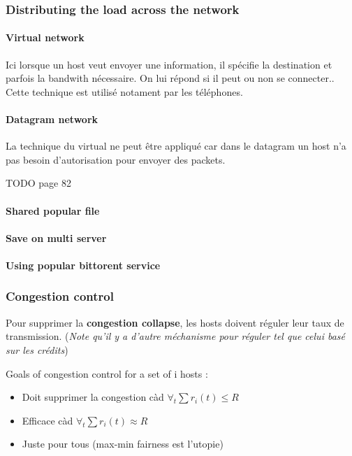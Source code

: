 \subsubsection{Distributing the load across the network}

\paragraph{Virtual network}
Ici lorsque un host veut envoyer une information, il spécifie la destination et parfois la
bandwith nécessaire. On lui répond si il peut ou non se connecter.. Cette technique
est utilisé notament par les téléphones.

\paragraph{Datagram network}
La technique du virtual ne peut être appliqué car dans le datagram un host n'a pas
besoin d'autorisation pour envoyer des packets.

TODO page 82


\paragraph{Shared popular file}

\paragraph{Save on multi server}

\paragraph{Using popular bittorent service}


\subsubsection{Congestion control}

Pour supprimer la \textbf{congestion collapse}, les hosts doivent réguler leur taux
de transmission. (\textit{Note qu'il y a d'autre méchanisme pour réguler tel que celui
basé sur les crédits})

Goals of congestion control for a set of i hosts :
\begin{itemize}
    \item Doit supprimer la congestion càd $\forall_t \sum r_i(t) \leq R$
    \item Efficace càd $\forall_t \sum r_i(t) \approx R$
    \item Juste pour tous (max-min fairness est l'utopie)
\end{itemize}

